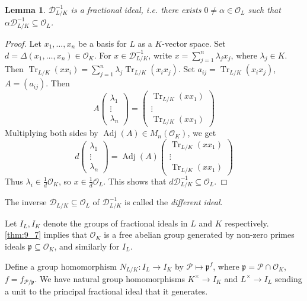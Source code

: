 \documentclass[11pt]{article}
\theoremstyle{definition}
\theoremstyle{plain}
\newtheorem{lemma}[definition]{Lemma}
\theoremstyle{remark}
\DeclareMathOperator{\Adj}{Adj}
\DeclareMathOperator{\Tr}{Tr}
\newcommand{\cD}{\mathcal{D}}
\newcommand{\cO}{\mathcal{O}}
\newcommand{\cP}{\mathcal{P}}
\newcommand{\fp}{\mathfrak{p}}
\begin{document}
\begin{lemma}\label{lem:12_6}
    $\cD_{L/K}^{-1}$ is a fractional ideal, i.e. there exists $0 \neq \alpha \in \cO_L$ such that $\alpha \cD_{L/K}^{-1} \subseteq \cO_L$.
\end{lemma}
\begin{proof}
    Let $x_1, \ldots, x_n$ be a basis for $L$ as a $K$-vector space. Set $d = \Delta(x_1, \ldots, x_n) \in \cO_K$. For $x \in \cD_{L/K}^{-1}$, write $x = \sum_{j=1}^n \lambda_j x_j$, where $\lambda_j \in K$. Then $\Tr_{L/K}(x x_i) = \sum_{j=1}^n \lambda_j \Tr_{L/K}(x_i x_j)$. Set $a_{ij} = \Tr_{L/K}(x_i x_j)$, $A = (a_{ij})$. Then
    \begin{equation*}
        A
        \begin{pmatrix} \lambda_1 \\ \vdots \\ \lambda_n \end{pmatrix} 
        =
        \begin{pmatrix} \Tr_{L/K}(x x_1) \\ \vdots \\ \Tr_{L/K}(x x_1) \end{pmatrix} 
    \end{equation*}
    Multiplying both sides by $\Adj(A) \in M_n(\cO_K)$, we get
    \begin{equation*}
        d
        \begin{pmatrix} \lambda_1 \\ \vdots \\ \lambda_n \end{pmatrix} 
        = \Adj(A)
        \begin{pmatrix} \Tr_{L/K}(x x_1) \\ \vdots \\ \Tr_{L/K}(x x_1) \end{pmatrix} 
    \end{equation*}
    Thus $\lambda_i \in \frac{1}{d} \cO_K$, so $x \in \frac{1}{d} \cO_L$. This shows that $d \cD_{L/K}^{-1} \subseteq \cO_L$.
\end{proof}

The inverse $\cD_{L/K} \subseteq \cO_L$ of $\cD_{L/K}^{-1}$ is called the \emph{different ideal}.

Let $I_L, I_K$ denote the groups of fractional ideals in $L$ and $K$ respectively. \autoref{thm:9_7} implies that $\cO_K$ is a free abelian group generated by non-zero primes ideals $\fp \subseteq \cO_K$, and similarly for $I_L$.

Define a group homomorphism $N_{L/K} : I_L \to I_K$ by $\cP \mapsto \fp^f$, where $\fp = \cP \cap \cO_K$, $f = f_{\cP / \fp}$. We have natural group homomorphisms $K^\times \to I_K$ and $L^\times \to I_L$ sending a unit to the principal fractional ideal that it generates.
\end{document}
